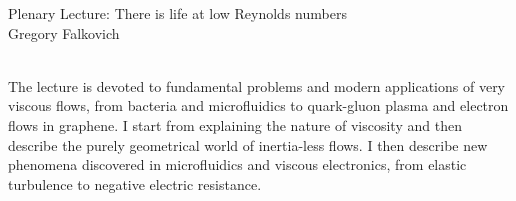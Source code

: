     {  
			{Plenary Lecture: There is life at low Reynolds numbers} \\ 			
    \normalfont\small Gregory Falkovich }
    
    {  \\    
    } 
      {  } 
	\vspace{1cm} 
	The lecture is devoted to fundamental problems and modern applications of very viscous flows, from bacteria and microfluidics to quark-gluon plasma and electron flows in graphene. I start from explaining the nature of viscosity and then describe the purely geometrical world of inertia-less flows. I then describe new phenomena discovered in microfluidics and viscous electronics, from elastic turbulence to negative electric resistance.
	
         
    \vspace{.5cm}
    \newpage
    

